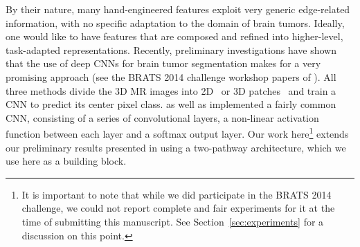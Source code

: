 \documentclass[final,5p,times,twocolumn]{elsarticle}
\begin{document}
By their nature, many hand-engineered features exploit very generic edge-related information, with no specific adaptation to the domain of brain tumors.  Ideally, one would like to have features that are composed and refined into higher-level, task-adapted representations. %
Recently, preliminary investigations have shown that the use of deep CNNs for brain tumor segmentation makes for a very promising approach (see the BRATS 2014 challenge workshop papers of \citet{Davy2014,Zikic2014,Urban2014}).   All three methods divide the 3D MR images into 2D~\citep{Davy2014,Zikic2014} or 3D patches~\citep{Urban2014} and train a CNN to predict its center pixel class. \citet{Urban2014} as well as \citet{Zikic2014} implemented a fairly common CNN, consisting of a series of convolutional layers, a non-linear activation function between each layer and a softmax output layer. Our work here\footnote{
It is important to note that while we did participate in the BRATS 2014 challenge, we could not report complete and fair experiments for it at the time of submitting this manuscript. See Section~\ref{sec:experiments} for a discussion on this point.
}
%
extends our preliminary results presented in \citet{Davy2014} using a two-pathway architecture, which we use here as a building block.  

\end{document}
